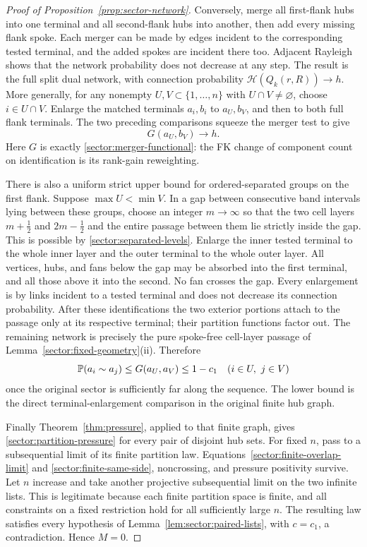 \begin{proof}[Proof of Proposition~\ref{prop:sector-network}]
Conversely, merge all first-flank hubs into one terminal and all
second-flank hubs into another, then add every missing flank spoke.
Each merger can be made by edges incident to the corresponding
tested terminal, and the added spokes are incident there too.
Adjacent Rayleigh shows that the network probability does not decrease
at any step.  The result
is the full split dual network, with connection probability
$\mathcal H(Q_k(r,R))\to h$.
More generally, for any nonempty $U,V\subset\{1,\ldots,n\}$ with
$U\cap V\ne\varnothing$, choose $i\in U\cap V$.  Enlarge the
matched terminals $a_i,b_i$ to $a_U,b_V$, and then to both full flank
terminals.  The two preceding comparisons squeeze the merger test
to give
\begin{equation}\label{sector:finite-overlap-limit}
 G(a_U,b_V)\longrightarrow h.
\end{equation}
Here $G$ is exactly \eqref{sector:merger-functional}: the FK change
of component count on identification is its rank-gain reweighting.

There is also a uniform strict upper bound for ordered-separated
groups on the first flank.  Suppose $\max U<\min V$.  In a gap
between consecutive band intervals lying between these groups,
choose an integer $m\to\infty$ so that the two cell layers
$m+\tfrac12$ and $2m-\tfrac12$ and the entire passage between them
lie strictly inside the gap.  This is possible by
\eqref{sector:separated-levels}.  Enlarge the inner tested terminal
to the whole inner layer and the outer terminal to the whole outer
layer.  All vertices, hubs, and fans below the gap may be absorbed
into the first terminal, and all those above it into the second.
No fan crosses the gap.  Every enlargement is by links incident to
a tested terminal and does not decrease its connection probability.
After these identifications the two exterior portions attach to
the passage only at its respective terminal; their partition
functions factor out.  The remaining network is precisely the pure
spoke-free cell-layer passage of
Lemma~\ref{sector:fixed-geometry}(ii).  Therefore
\begin{equation}\label{sector:finite-same-side}
 \mathbb P(a_i\sim a_j)\leq G(a_U,a_V)\leq1-c_1
 \quad(i\in U,\ j\in V)
\end{equation}
once the original sector is sufficiently far along the sequence.
The lower bound is the direct terminal-enlargement comparison in
the original finite hub graph.

Finally Theorem~\ref{thm:pressure}, applied to that finite graph,
gives \eqref{sector:partition-pressure} for every pair of disjoint
hub sets.  For fixed $n$, pass to a subsequential limit of its finite
partition law.  Equations~\eqref{sector:finite-overlap-limit} and
\eqref{sector:finite-same-side}, noncrossing, and pressure positivity
survive.  Let $n$ increase and take another projective subsequential
limit on the two infinite lists.  This is legitimate because each
finite partition space is finite, and all constraints on a fixed
restriction hold for all sufficiently large $n$.  The resulting law
satisfies every hypothesis of Lemma~\ref{lem:sector:paired-lists},
with $c=c_1$, a contradiction.  Hence $M=0$.


\end{proof}
